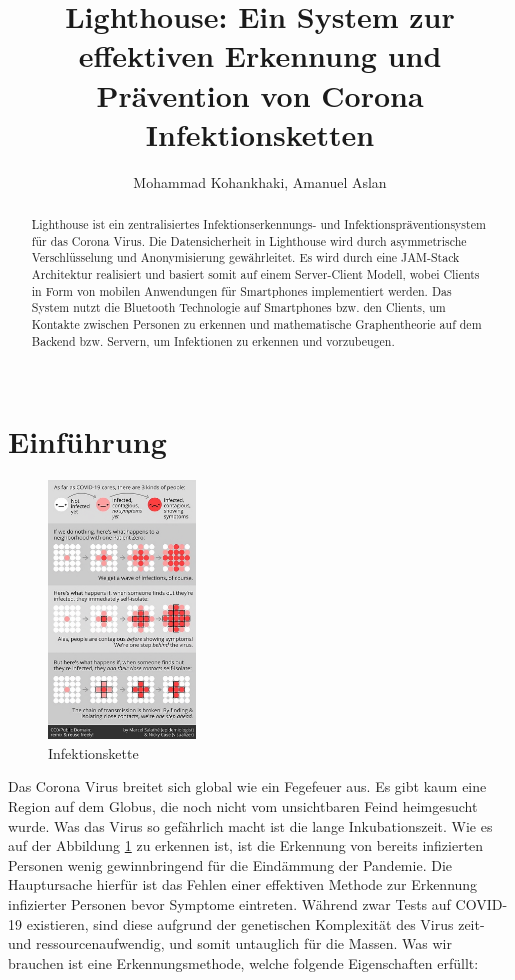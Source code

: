 \documentclass[12pt]{article}
\title{Lighthouse: Ein System zur effektiven Erkennung und Prävention von Corona Infektionsketten}
\author{Mohammad Kohankhaki, Amanuel Aslan\inst{2}}
\begin{document}
 
\maketitle

\begin{abstract}
  Lighthouse ist ein zentralisiertes Infektionserkennungs- und Infektionspräventionsystem für das Corona Virus. Die Datensicherheit in Lighthouse wird durch asymmetrische Verschlüsselung und Anonymisierung gewährleitet. Es wird durch eine JAM-Stack Architektur realisiert und basiert somit auf einem Server-Client Modell, wobei Clients in Form von mobilen Anwendungen für Smartphones implementiert werden. Das System nutzt die Bluetooth Technologie auf Smartphones bzw. den Clients, um Kontakte zwischen Personen zu erkennen und mathematische Graphentheorie auf dem Backend bzw. Servern, um Infektionen zu erkennen und vorzubeugen. \\ \\
\end{abstract}

\section{Einführung}
\begin{figure}
    \centering
    \includegraphics[width=0.35\textwidth]{res/infection_chain.jpeg}
    \caption{Infektionskette}
    \label{fig:inf_chain}
\end{figure}
Das Corona Virus breitet sich global wie ein Fegefeuer aus. Es gibt kaum eine Region auf dem Globus, die noch nicht vom unsichtbaren Feind heimgesucht wurde. Was das Virus so gefährlich macht ist die lange Inkubationszeit. Wie es auf der Abbildung \ref{fig:inf_chain} zu erkennen ist, ist die Erkennung von
bereits infizierten Personen wenig gewinnbringend für die Eindämmung der Pandemie. Die Hauptursache hierfür ist das Fehlen einer effektiven Methode zur Erkennung infizierter Personen bevor Symptome eintreten.
Während zwar Tests auf COVID-19 existieren, sind diese aufgrund
der genetischen Komplexität des Virus zeit- und ressourcenaufwendig, und
somit untauglich für die Massen. Was wir brauchen ist eine Erkennungsmethode, welche folgende Eigenschaften erfüllt:
\end{document}
